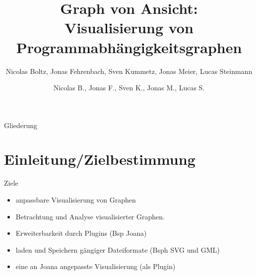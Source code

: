 \documentclass[18pt]{beamer}
\title[Graph von Ansicht]{Graph von Ansicht:\\ Visualisierung von Programmabhängigkeitsgraphen}
\subtitle{}
\author{Nicolas Boltz, Jonas Fehrenbach, Sven Kummetz, Jonas Meier, Lucas Steinmann}
\institute{}
\begin{document}

\begin{frame}
\titlepage
\end{frame}

\author{Nicolas B., Jonas F., Sven K., Jonas M., Lucas S.}
\begin{frame}{Gliederung}
\tableofcontents
\end{frame}

\section{Einleitung/Zielbestimmung}
\begin{frame}{Ziele}
\begin{itemize}
\item anpassbare Visualisierung von Graphen
\pause
\item Betrachtung und Analyse visualisierter Graphen.
\pause
\item Erweiterbarkeit durch Plugins (Bsp Joana)
\pause
\item laden und Speichern gängiger Dateiformate (Bsph SVG und GML)
\pause
\item eine an Joana angepasste Visualisierung (als Plugin)
\end{itemize}
\end{frame}
\end{document}
